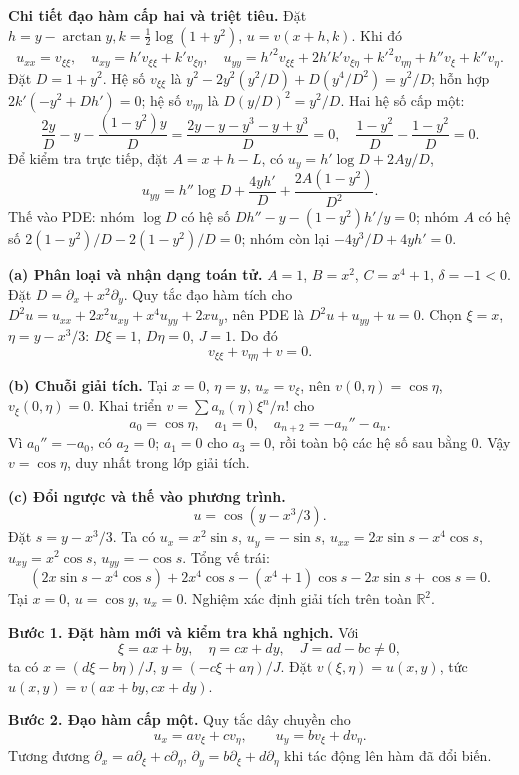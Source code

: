 \textbf{Chi tiết đạo hàm cấp hai và triệt tiêu.} Đặt $h=y-\arctan y,k=\frac12\log(1+y^2)$, $u=v(x+h,k)$. Khi đó
\[u_{xx}=v_{\xi\xi},\quad u_{xy}=h'v_{\xi\xi}+k'v_{\xi\eta},\quad
u_{yy}=h'^2v_{\xi\xi}+2h'k'v_{\xi\eta}+k'^2v_{\eta\eta}+h''v_\xi+k''v_\eta.\]
Đặt $D=1+y^2$. Hệ số $v_{\xi\xi}$ là $y^2-2y^2(y^2/D)+D(y^4/D^2)=y^2/D$; hỗn hợp $2k'(-y^2+Dh')=0$; hệ số $v_{\eta\eta}$ là $D(y/D)^2=y^2/D$. Hai hệ số cấp một:
\[\frac{2y}D-y-\frac{(1-y^2)y}D
=\frac{2y-y-y^3-y+y^3}D=0,\quad
\frac{1-y^2}D-\frac{1-y^2}D=0.\]
Để kiểm tra trực tiếp, đặt $A=x+h-L$, có $u_y=h'\log D+2Ay/D$,
\[u_{yy}=h''\log D+\frac{4yh'}D+\frac{2A(1-y^2)}{D^2}.\]
Thế vào PDE: nhóm $\log D$ có hệ số $Dh''-y-(1-y^2)h'/y=0$; nhóm $A$ có hệ số $2(1-y^2)/D-2(1-y^2)/D=0$; nhóm còn lại $-4y^3/D+4yh'=0$.

\textbf{(a) Phân loại và nhận dạng toán tử.} $A=1$, $B=x^2$, $C=x^4+1$, $\delta=-1<0$. Đặt $D=\partial_x+x^2\partial_y$. Quy tắc đạo hàm tích cho $D^2u=u_{xx}+2x^2u_{xy}+x^4u_{yy}+2xu_y$, nên PDE là $D^2u+u_{yy}+u=0$. Chọn $\xi=x$, $\eta=y-x^3/3$: $D\xi=1$, $D\eta=0$, $J=1$. Do đó
\[\boxed{v_{\xi\xi}+v_{\eta\eta}+v=0.}\]

\textbf{(b) Chuỗi giải tích.} Tại $x=0$, $\eta=y$, $u_x=v_\xi$, nên $v(0,\eta)=\cos\eta$, $v_\xi(0,\eta)=0$. Khai triển $v=\sum a_n(\eta)\xi^n/n!$ cho
\[a_0=\cos\eta,\quad a_1=0,\quad a_{n+2}=-a_n''-a_n.\]
Vì $a_0''=-a_0$, có $a_2=0$; $a_1=0$ cho $a_3=0$, rồi toàn bộ các hệ số sau bằng $0$. Vậy $v=\cos\eta$, duy nhất trong lớp giải tích.

\textbf{(c) Đổi ngược và thế vào phương trình.}
\[\boxed{u=\cos(y-x^3/3).}\]
Đặt $s=y-x^3/3$. Ta có $u_x=x^2\sin s$, $u_y=-\sin s$, $u_{xx}=2x\sin s-x^4\cos s$, $u_{xy}=x^2\cos s$, $u_{yy}=-\cos s$. Tổng vế trái:
\[(2x\sin s-x^4\cos s)+2x^4\cos s-(x^4+1)\cos s-2x\sin s+\cos s=0.\]
Tại $x=0$, $u=\cos y$, $u_x=0$. Nghiệm xác định giải tích trên toàn $\mathbb R^2$.

\textbf{Bước 1. Đặt hàm mới và kiểm tra khả nghịch.} Với
\[\xi=ax+by,\quad\eta=cx+dy,\quad J=ad-bc\ne0,\]
ta có $x=(d\xi-b\eta)/J$, $y=(-c\xi+a\eta)/J$. Đặt $v(\xi,\eta)=u(x,y)$, tức $u(x,y)=v(ax+by,cx+dy)$.

\textbf{Bước 2. Đạo hàm cấp một.} Quy tắc dây chuyền cho
\[u_x=a v_\xi+c v_\eta,\qquad u_y=b v_\xi+d v_\eta.\]
Tương đương $\partial_x=a\partial_\xi+c\partial_\eta$, $\partial_y=b\partial_\xi+d\partial_\eta$ khi tác động lên hàm đã đổi biến.

